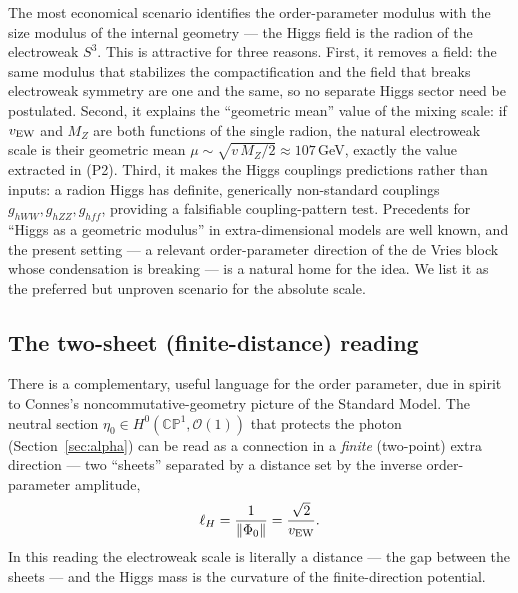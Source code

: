 \documentclass[11pt]{article}
\theoremstyle{plain}
\theoremstyle{definition}
\newcommand{\cO}{\mathcal{O}}
\begin{document}
The most economical scenario identifies the order-parameter modulus with the
size modulus of the internal geometry --- the Higgs field is the radion of
the electroweak $S^3$. This is attractive for three reasons. First, it
removes a field: the same modulus that stabilizes the compactification and
the field that breaks electroweak symmetry are one and the same, so no
separate Higgs sector need be postulated. Second, it explains the
``geometric mean'' value of the mixing scale: if $v_{\rm EW}$ and $M_Z$ are
both functions of the single radion, the natural electroweak scale is their
geometric mean $\mu\sim\sqrt{v\,M_Z/2}\approx107\,$GeV, exactly the value
extracted in (P2). Third, it makes the Higgs couplings predictions rather
than inputs: a radion Higgs has definite, generically non-standard couplings
$g_{hWW},g_{hZZ},g_{hff}$, providing a falsifiable coupling-pattern test.
Precedents for ``Higgs as a geometric modulus'' in extra-dimensional models
are well known, and the present setting --- a relevant order-parameter
direction of the de Vries block whose condensation is breaking --- is a
natural home for the idea. We list it as the preferred but unproven scenario
for the absolute scale.

\subsection{The two-sheet (finite-distance) reading}
\label{sec:connes}

There is a complementary, useful language for the order parameter, due in
spirit to Connes's noncommutative-geometry picture of the Standard Model.
The neutral section $\eta_0\in H^0(\mathbb{CP}^1,\cO(1))$ that protects the
photon (Section~\ref{sec:alpha}) can be read as a connection in a
\emph{finite} (two-point) extra direction --- two ``sheets'' separated by a
distance set by the inverse order-parameter amplitude,
\begin{equation}
\ell_H=\frac1{\|\Phi_0\|}=\frac{\sqrt2}{v_{\rm EW}}.
\end{equation}
In this reading the electroweak scale is literally a distance --- the gap
between the sheets --- and the Higgs mass is the curvature of the
finite-direction potential.
\end{document}
